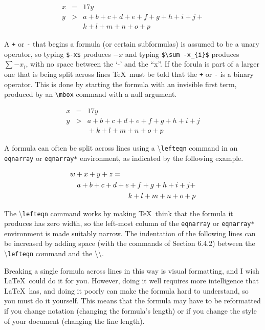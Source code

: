 \documentclass[twocolumn]{book}        %
\begin{document}
\begin{eqnarray*}
    x & = & 17y \\
    y & > & a + b + c + d + e + f + g + h + i + j + \nonumber \\ 
      &   & k + l + m + n + o + p 
\end{eqnarray*}

A \texttt{+} or \texttt{-} that begins a formula (or certain subformulas) is assumed to be a 
unary operator, so typing \texttt{\$-x\$} produces $-x$ and typing \texttt{\$\textbackslash sum -x\_\{i\}\$}
produces \( \sum -x_{i} \), with no space between the `-' and the ``x''. If the forula is part of a larger one 
that is being split across lines \TeX\ must be told that the \texttt{+} or \texttt{-} is a binary operator.
This is done by starting the formula with an invisible first term, produced by an \texttt{\textbackslash mbox} 
command with a null argument.

\begin{eqnarray*}
    x & = & 17y \\
    y & > & a + b + c + d + e + f + g + h + i + j \nonumber \\ 
      &   &\mbox{} + k + l + m + n + o + p 
\end{eqnarray*}

A formula can often be split across lines using a \textbackslash \texttt{lefteqn} command in an 
\texttt{eqnarray} or \texttt{eqnarray*} environment, as indicated by the following example.

\begin{eqnarray*}
\lefteqn{w+x+y+z = } \\
    & & a + b + c + d + e + f + g + h + i + j + \nonumber \\ 
    & & k + l + m + n + o + p
\end{eqnarray*}

The \textbackslash \texttt{lefteqn} command works by making \TeX\ think that the formula 
it produces has zero width, so the left-most column of the \texttt{eqnarray} or \texttt{eqnarray*} 
environment is made suitably narrow. The indentation of the following lines can 
be increased by adding space (with the commands of Section 6.4.2) between the 
\textbackslash \texttt{lefteqn} command and the \textbackslash \textbackslash.

Breaking a single formula across lines in this way is visual formatting, and I wish \LaTeX\ 
could do it for you. However, doing it well requires more intelligence that \LaTeX\ has, and 
doing it poorly can make the formula hard to understand, so you must do it yourself. This means 
that the formula may have to be reformatted if you change notation (changing the formula's length) 
or if you change the style of your document (changing the line length).
\end{document}
